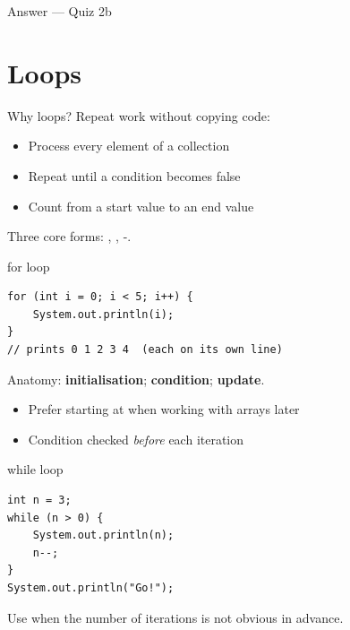 \documentclass[aspectratio=169,11pt]{beamer}
\begin{document}
    \begin{frame}{Answer --- Quiz 2b}
    \end{frame}

    \section{Loops}

    \begin{frame}{Why loops?}
        Repeat work without copying code:
        \begin{itemize}
            \item Process every element of a collection
            \item Repeat until a condition becomes false
            \item Count from a start value to an end value
        \end{itemize}
        \vspace{0.4em}
        Three core forms: , , -.
    \end{frame}

    \begin{frame}[fragile]{for loop}
        \begin{lstlisting}
for (int i = 0; i < 5; i++) {
    System.out.println(i);
}
// prints 0 1 2 3 4  (each on its own line)
        \end{lstlisting}
        \vspace{0.3em}
        Anatomy: \textbf{initialisation}; \textbf{condition}; \textbf{update}.
        \begin{itemize}
            \item Prefer starting at  when working with arrays later
            \item Condition checked \emph{before} each iteration
        \end{itemize}
    \end{frame}

    \begin{frame}[fragile]{while loop}
        \begin{lstlisting}
int n = 3;
while (n > 0) {
    System.out.println(n);
    n--;
}
System.out.println("Go!");
        \end{lstlisting}
        \vspace{0.3em}
        Use  when the number of iterations is not obvious in advance.
        \vspace{0.3em}
    \end{frame}
\end{document}
